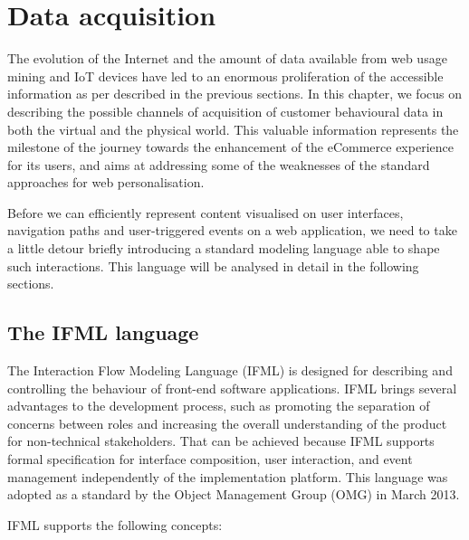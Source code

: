 \chead{}
\chapter{Data acquisition}

The evolution of the Internet and the amount of data available from web usage mining and IoT devices have led to an enormous proliferation of the accessible information as per described in the previous sections.  In this chapter, we focus on describing the possible channels of acquisition of customer behavioural data in both the virtual and the physical world. This valuable information represents the milestone of the journey towards the enhancement of the eCommerce experience for its users, and aims at addressing some of the weaknesses of the standard approaches for web personalisation.

Before we can efficiently represent content visualised on user interfaces, navigation paths and user-triggered events on a web application, we need to take a little detour briefly introducing a standard modeling language able to shape such interactions. This language will be analysed in detail in the following sections.

\section{The IFML language}
\label{the-ifml-language}

The Interaction Flow Modeling Language (IFML)\cite{IFML-1, IFML-2} is designed for describing and controlling the behaviour of front-end software applications. IFML brings several advantages to the development process, such as promoting the separation of concerns between roles and increasing the overall understanding of the product for non-technical stakeholders. That can be achieved because IFML supports formal specification for interface composition, user interaction, and event management independently of the implementation platform. This language was adopted as a standard by the Object Management Group (OMG) in March 2013.

IFML supports the following concepts: 

